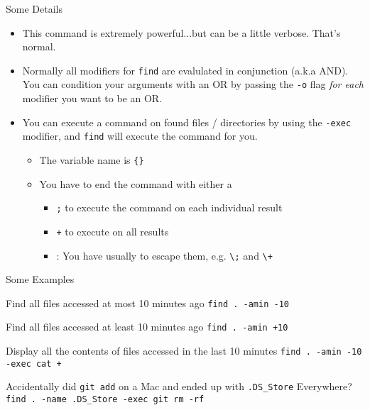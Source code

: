 \begin{frame}[fragile]{Some Details}
  \begin{itemize}[<+- | alert@+>]
    \item This command is extremely powerful...but can be a little verbose.  That's normal.
    \item Normally all modifiers for \texttt{find} are evalulated in conjunction (a.k.a AND).  You can condition
          your arguments with an OR by passing the \texttt{-o} flag \emph{for each} modifier you want to be an OR.
    \item You can execute a command on found files / directories by using the \texttt{-exec} modifier, and \texttt{find}
          will execute the command for you.
    \begin{itemize}[<+- | alert@+>]
      \item The variable name is \texttt{\{\}}
      \item You have to end the command with either a
      \begin{itemize}[<+- | alert@+>]
        \item \texttt{;} to execute the command on each individual result
        \item \texttt{+} to execute on all results
        \item {}: You have usually to escape them, e.g. \texttt{\textbackslash ;} and \texttt{\textbackslash +}
      \end{itemize}
    \end{itemize}
  \end{itemize}
\end{frame}

\begin{frame}[fragile]{Some Examples}
  \begin{block}{Find all files accessed at most 10 minutes ago}
    \texttt{find . -amin -10}
  \end{block}
  \begin{block}{Find all files accessed at least 10 minutes ago}
    \texttt{find . -amin +10}
  \end{block}
  \begin{block}{Display all the contents of files accessed in the last 10 minutes}
    \texttt{find . -amin -10 -exec cat {} +}
  \end{block}
  \begin{block}{Accidentally did \texttt{git add} on a Mac and ended up with \texttt{.DS\_Store} Everywhere? }
    \texttt{find . -name .DS\_Store -exec git rm -rf {} \;}
  \end{block}
\end{frame}

